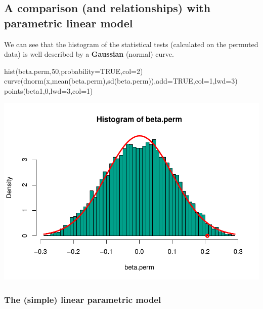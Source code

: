 \documentclass[
]{article}
\newenvironment{Shaded}{\begin{snugshade}}{\end{snugshade}}
\newcommand{\AttributeTok}[1]{\textcolor[rgb]{0.77,0.63,0.00}{#1}}
\newcommand{\ConstantTok}[1]{\textcolor[rgb]{0.00,0.00,0.00}{#1}}
\newcommand{\DecValTok}[1]{\textcolor[rgb]{0.00,0.00,0.81}{#1}}
\newcommand{\FunctionTok}[1]{\textcolor[rgb]{0.00,0.00,0.00}{#1}}
\newcommand{\NormalTok}[1]{#1}
\begin{document}
\hypertarget{a-comparison-and-relationships-with-parametric-linear-model}{%
\subsection{A comparison (and relationships) with parametric linear
model}\label{a-comparison-and-relationships-with-parametric-linear-model}}

We can see that the histogram of the statistical tests (calculated on
the permuted data) is well described by a \textbf{Gaussian }(normal)
curve.

\begin{Shaded}
\begin{Highlighting}[]
\FunctionTok{hist}\NormalTok{(beta.perm,}\DecValTok{50}\NormalTok{,}\AttributeTok{probability=}\ConstantTok{TRUE}\NormalTok{,}\AttributeTok{col=}\DecValTok{2}\NormalTok{)}
\FunctionTok{curve}\NormalTok{(}\FunctionTok{dnorm}\NormalTok{(x,}\FunctionTok{mean}\NormalTok{(beta.perm),}\FunctionTok{sd}\NormalTok{(beta.perm)),}\AttributeTok{add=}\ConstantTok{TRUE}\NormalTok{,}\AttributeTok{col=}\DecValTok{1}\NormalTok{,}\AttributeTok{lwd=}\DecValTok{3}\NormalTok{)}
\FunctionTok{points}\NormalTok{(beta1,}\DecValTok{0}\NormalTok{,}\AttributeTok{lwd=}\DecValTok{3}\NormalTok{,}\AttributeTok{col=}\DecValTok{1}\NormalTok{)}
\end{Highlighting}
\end{Shaded}

\begin{center}\includegraphics{perm_files/figure-latex/unnamed-chunk-17-1} \end{center}

\hypertarget{the-simple-linear-parametric-model}{%
\subsubsection{The (simple) linear parametric
model}\label{the-simple-linear-parametric-model}}
\end{document}
